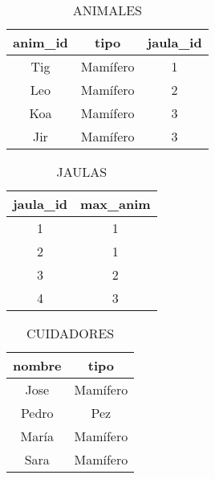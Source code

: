 \begin{enumerate}
    \begin{table}[h!]
    \centering
    \caption{ANIMALES}
    \begin{tabular}{|c|c|c|}
    \hline
    \textbf{anim\_id} & \textbf{tipo} & \textbf{jaula\_id} \\ \hline
    Tig              & Mamífero      & 1                  \\ \hline
    Leo              & Mamífero      & 2                  \\ \hline
    Koa              & Mamífero      & 3                  \\ \hline
    Jir              & Mamífero      & 3                  \\ \hline
    \end{tabular}
    \end{table}

    \begin{table}[h!]
    \centering
    \caption{JAULAS}
    \begin{tabular}{|c|c|}
    \hline
    \textbf{jaula\_id} & \textbf{max\_anim} \\ \hline
    1                  & 1                  \\ \hline
    2                  & 1                  \\ \hline
    3                  & 2                  \\ \hline
    4                  & 3                  \\ \hline
    \end{tabular}
    \end{table}

    \begin{table}[h!]
    \centering
    \caption{CUIDADORES}
    \begin{tabular}{|c|c|}
    \hline
    \textbf{nombre} & \textbf{tipo} \\ \hline
    Jose           & Mamífero      \\ \hline
    Pedro          & Pez           \\ \hline
    María          & Mamífero      \\ \hline
    Sara           & Mamífero      \\ \hline
    \end{tabular}
    \end{table}


\end{enumerate}
